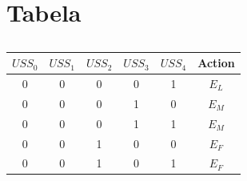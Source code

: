 \section{Tabela}

\begin{table}[!htb]
\centering
\caption{}
\label{IA}
\begin{tabular}{|ccccc|c|}
\hline
{\color[HTML]{00009B} \textbf{$USS_0$}} & {\color[HTML]{00009B} \textbf{$USS_1$}} & {\color[HTML]{00009B} \textbf{$USS_2$}} & 
{\color[HTML]{00009B} \textbf{$USS_3$}} & {\color[HTML]{00009B} \textbf{$USS_4$}} & {\color[HTML]{FE0000} \textbf{Action}} \\ 
\hline
{\color[HTML]{00009B} 0}                                     & {\color[HTML]{00009B} 0}                                    & {\color[HTML]{00009B} 0}                                    & {\color[HTML]{00009B} 0}                                    & {\color[HTML]{00009B} 1}                                    & {\color[HTML]{FE0000} $E_L$}                                     \\ \hline
{\color[HTML]{00009B} 0}                                     & {\color[HTML]{00009B} 0}                                    & {\color[HTML]{00009B} 0}                                    & {\color[HTML]{00009B} 1}                                    & {\color[HTML]{00009B} 0}                                    & {\color[HTML]{FE0000} $E_M$}                                     \\ \hline
{\color[HTML]{00009B} 0}                                     & {\color[HTML]{00009B} 0}                                    & {\color[HTML]{00009B} 0}                                    & {\color[HTML]{00009B} 1}                                    & {\color[HTML]{00009B} 1}                                    & {\color[HTML]{FE0000} $E_M$}                                     \\ \hline
{\color[HTML]{00009B} 0}                                     & {\color[HTML]{00009B} 0}                                    & {\color[HTML]{00009B} 1}                                    & {\color[HTML]{00009B} 0}                                    & {\color[HTML]{00009B} 0}                                    & {\color[HTML]{FE0000} $E_F$}                                     \\ \hline
{\color[HTML]{00009B} 0}                                     & {\color[HTML]{00009B} 0}                                    & {\color[HTML]{00009B} 1}                                    & {\color[HTML]{00009B} 0}                                    & {\color[HTML]{00009B} 1}                                    & {\color[HTML]{FE0000} $E_F$}                                     \\ \hline

\end{tabular}
\end{table}
